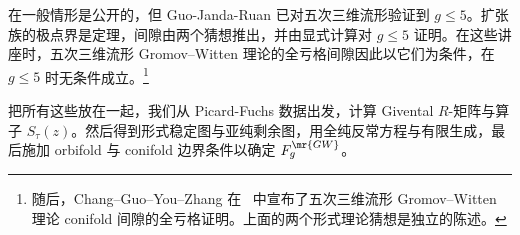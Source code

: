 \begin{rmk}
     在一般情形是公开的，但 Guo-Janda-Ruan 已对五次三维流形验证到 \(g \leq 5\)。扩张族的极点界是定理，间隙由两个猜想推出，并由显式计算对 \(g \leq 5\) 证明。在这些讲座时，五次三维流形 Gromov--Witten 理论的全亏格间隙因此以它们为条件，在 \(g \leq 5\) 时无条件成立。\footnote{随后，Chang--Guo--You--Zhang 在~\cite{CGYZ2026} 中宣布了五次三维流形 Gromov--Witten 理论 conifold 间隙的全亏格证明。上面的两个形式理论猜想是独立的陈述。}
\end{rmk}

把所有这些放在一起，我们从 Picard-Fuchs 数据出发，计算 Givental \(R\)-矩阵与算子 \(S_{\tau}(z)\)。然后得到形式稳定图与亚纯剩余图，用全纯反常方程与有限生成，最后施加 orbifold 与 conifold 边界条件以确定 \(F_g^{\mr{GW}}\)。

